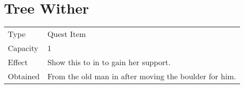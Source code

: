 \section{Tree Wither}
\label{item:tree_wither}


\noindent\begin{tabularx}{\textwidth}[l]{lX}
	Type
	& Quest Item
\\ %
	Capacity
	& 1
\\ %
	Effect
	& Show this to \nameref{char:kaeli} in \nameref{map:foresta} to gain her support.
\\ %
	Obtained
	& From the old man in \nameref{map:level_forest} after moving the boulder for him.
\end{tabularx}
